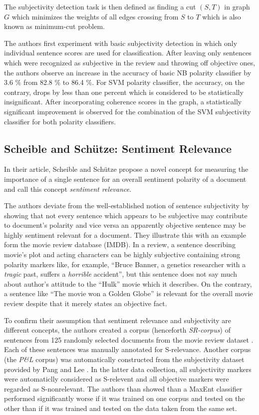 \documentclass[a4paper,11pt]{article}
\begin{document}
The subjectivity detection task is then defined as finding a cut
$(S,T)$ in graph $G$ which minimizes the weights of all edges crossing
from $S$ to $T$ which is also known as minimum-cut problem.

The authors first experiment with basic subjectivity detection in
which only individual sentence scores are used for classification.
After leaving only sentences which were recognized as subjective in
the review and throwing off objective ones, the authors observe an
increase in the accuracy of basic NB polarity classifier by 3.6 \%
from 82.8 \% to 86.4 \%.  For SVM polarity classifier, the accuracy,
on the contrary, drops by less than one percent which is considered to
be statistically insignificant.  After incorporating coherence scores
in the graph, a statistically significant improvement is observed for
the combination of the SVM subjectivity classifier for both polarity
classifiers.

\subsection{Scheible and Sch\"utze: Sentiment Relevance\cite{Scheible-13}}

In their article, Scheible and Sch\"utze propose a novel concept for
measuring the importance of a single sentence for an overall sentiment
polarity of a document and call this concept \textit{sentiment
  relevance}.

The authors deviate from the well-established notion of sentence
subjectivity by showing that not every sentence which appears to be
subjective may contribute to document's polarity and vice versa an
apparently objective sentence may be highly sentiment relevant for a
document.  They illustrate this with an example form the movie review
database (IMDB).  In a review, a sentence describing movie's plot and
acting characters can be highly subjective containing strong polarity
markers like, for example, ``Bruce Banner, a genetics researcher with
a \textit{tragic} past, suffers a \textit{horrible} accident'', but
this sentence does not say much about author's attitude to the
``Hulk'' movie which it describes.  On the contrary, a sentence like
``The movie won a Golden Globe'' is relevant for the overall movie
review despite that it merely states an objective fact.

To confirm their assumption that sentiment relevance and subjectivity
are different concepts, the authors created a corpus (henceforth
\textit{SR-corpus}) of sentences from 125 randomly selected documents
from the movie review dataset \cite{Pang-Lee-02}.  Each of these sentences
was manually annotated for S-relevance.  Another corpus (the
\textit{P\&L} corpus) was automatically constructed from the
subjectivity dataset provided by Pang and Lee \cite{Pang-Lee-04}.  In
the latter data collection, all subjectivity markers were automaticlly
considered as S-relevent and all objective markers were regarded as
S-nonrelevant.  The authors than showed than a MaxEnt classifier
performed significantly worse if it was trained on one corpus and
tested on the other than if it was trained and tested on the data
taken from the same set.
\end{document}
